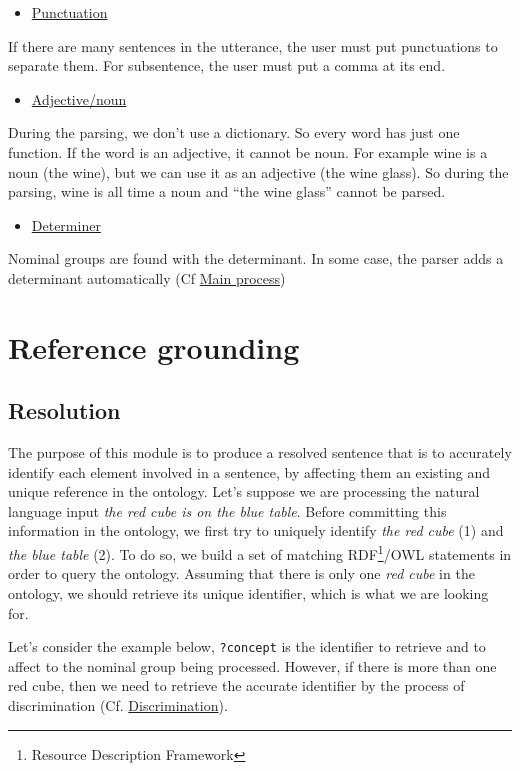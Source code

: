 \documentclass[twoside,a4paper,10pt]{report}
\begin{document}
\begin{itemize}
    \item  \underline{Punctuation}
\end{itemize}
If there are many sentences in the utterance, the user must put punctuations to separate them. For subsentence, the user must put a comma at its end.


\begin{itemize}
    \item  \underline{Adjective/noun}
\end{itemize}
During the parsing, we don’t use a dictionary. So every word has just one function. If the word is an adjective, it cannot be noun. For example wine is a noun (the wine), but we can use it as an adjective (the wine glass). So during the parsing, wine is all time a noun and “the wine glass” cannot be parsed.


\begin{itemize}
    \item  \underline{Determiner}
\end{itemize}
Nominal groups are found with the determinant. In some case, the parser adds a determinant automatically (Cf \hyperref[0e76170b5e24f80d8e04eca241527e68]{Main process})


\chapter{Reference grounding}
\label{d0c18356358d3557c631fba761c15653}%

\section{Resolution}
\label{b7e164b34ff76b1cda93a058604190da}%
The purpose of this module is to produce a resolved sentence that is to accurately identify each element involved in a sentence, by affecting them an existing and unique reference in the ontology.
Let's suppose we are processing the natural language input \textsl{the red cube is on the blue table}. Before committing this information in the ontology, we first try to uniquely identify \textsl{the red cube} (1) and \textsl{the blue table} (2).
To do so, we build a set of matching RDF\footnote{Resource Description Framework}/OWL statements in order to query the ontology. 
Assuming that there is only one \textsl{red cube} in the ontology, we should retrieve its unique identifier, which is what we are looking for.

Let's consider the example below, \texttt{?concept} is the identifier to retrieve and to affect to the nominal group being processed.    
However, if there is more than one red cube, then we need to retrieve the accurate identifier by the process of discrimination (Cf. \hyperref[974418acf6ac4871b739b9591436865a]{Discrimination}). 
\end{document}
